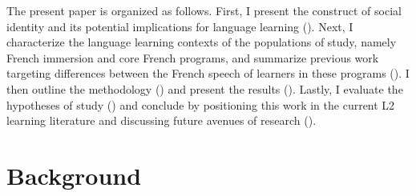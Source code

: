 \documentclass[output=paper,colorlinks,citecolor=brown,draftmode]{langscibook}
\begin{document}
The present paper is organized as follows. First, I present the construct of social identity and its potential implications for language learning (). Next, I characterize the language learning contexts of the populations of study, namely French immersion and core French programs, and summarize previous work targeting differences between the French speech of learners in these programs (). I then outline the methodology () and present the results (). Lastly, I evaluate the hypotheses of study () and conclude by positioning this work in the current L2 learning literature and discussing future avenues of research ().

\section{Background}
\end{document}
